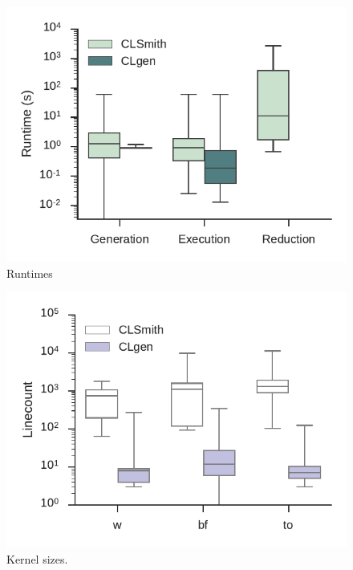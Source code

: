 \begin{figure}
	\centering %
	\includegraphics[width=\columnwidth]{build/img/runtimes}%
	\caption{%
		Runtimes%
	}%
	\label{fig:runtimes} %
\end{figure}


\begin{figure}
	\centering %
	\includegraphics[width=\columnwidth]{build/img/kernel-sizes}%
	\caption{%
		Kernel sizes. %
	}%
	\label{fig:kernel-sizes} %
\end{figure}
